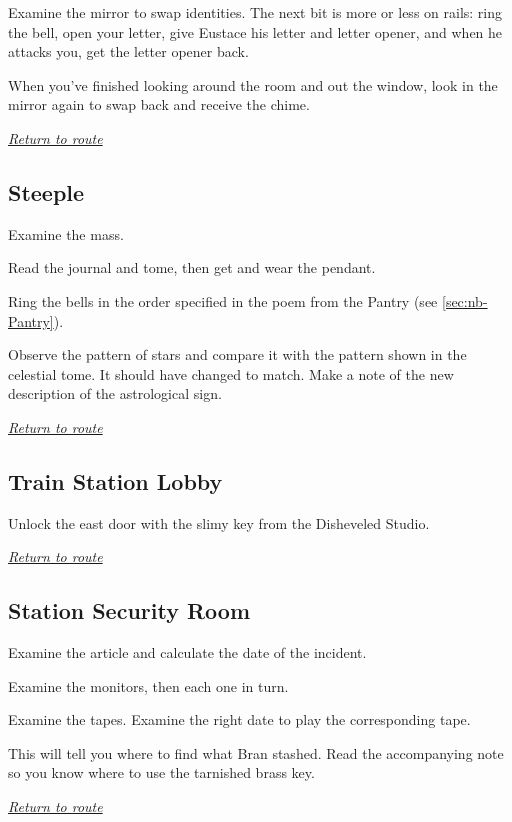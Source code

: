 \documentclass[a5paper]{extarticle}
\begin{document}
Examine the mirror to swap identities. The next bit is more or less on rails:
ring the bell, open your letter, give Eustace his letter and letter opener,
and when he attacks you, get the letter opener back.

When you've finished looking around the room and out the window,
look in the mirror again to swap back and receive the chime.

\hyperref[sec:route-13]{\emph{Return to route}}

\newpage
\subsection{Steeple}\label{sec:sol-Steeple}

Examine the mass.

Read the journal and tome, then get and wear the pendant.

Ring the bells in the order specified in the poem from the Pantry
(see \cref{sec:nb-Pantry}).

Observe the pattern of stars and compare it with the pattern shown in the
celestial tome. It should have changed to match.
Make a note of the new description of the astrological sign.

\hyperref[sec:route-13]{\emph{Return to route}}

\newpage
\subsection{Train Station Lobby}\label{sec:sol-Train-Station-Lobby}

Unlock the east door with the slimy key from the Disheveled Studio.

\hyperref[sec:route-13]{\emph{Return to route}}

\newpage
\subsection{Station Security Room}\label{sec:sol-Station-Security-Room}

Examine the article and calculate the date of the incident.

Examine the monitors, then each one in turn.

Examine the tapes. Examine the right date to play the corresponding tape.

This will tell you where to find what Bran stashed.
Read the accompanying note so you know where to use the tarnished brass key.

\hyperref[sec:route-13]{\emph{Return to route}}
\end{document}
